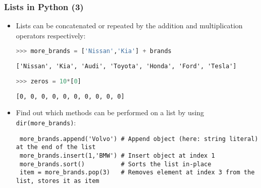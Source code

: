   \begin{frame}[fragile]
    \frametitle{Lists in Python (3)}
    \begin{itemize}
      \item Lists can be concatenated or repeated by the addition and multiplication operators respectively: 
      \begin{lstlisting}[language=Python,numbers=none]
  >>> more_brands = ['Nissan','Kia'] + brands
      \end{lstlisting}
      \begin{lstlisting}[style=PyOutput]
  ['Nissan', 'Kia', 'Audi', 'Toyota', 'Honda', 'Ford', 'Tesla']
      \end{lstlisting}
      \begin{lstlisting}[language=Python,numbers=none]
  >>> zeros = 10*[0]
      \end{lstlisting}
      \begin{lstlisting}[style=PyOutput]
  [0, 0, 0, 0, 0, 0, 0, 0, 0, 0]
      \end{lstlisting}
      \item Find out which methods can be performed on a list by using \lstinline|dir(more_brands)|:
      \begin{lstlisting}
 more_brands.append('Volvo') # Append object (here: string literal) at the end of the list 
 more_brands.insert(1,'BMW') # Insert object at index 1
 more_brands.sort()          # Sorts the list in-place
 item = more_brands.pop(3)   # Removes element at index 3 from the list, stores it as item
 \end{lstlisting}
    \end{itemize}
\end{frame}
 
